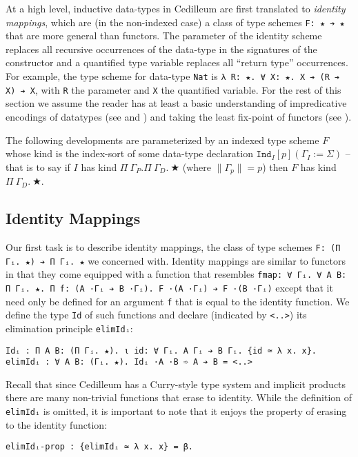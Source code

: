 \documentclass{article}
\newcommand{\indast}[4]{\texttt{Ind}_{#1} [#2] (#3 := #4)}
\newcommand{\lenc}[1]{\|#1\|}
\begin{document}
At a high level, inductive data-types in Cedilleum are first translated to
\textit{identity mappings}, which are (in the non-indexed case) a class of type
schemes \verb;F: ★ ➔ ★; that are more general than functors. The parameter of
the identity scheme replaces all recursive occurrences of the data-type in the
signatures of the constructor and a quantified type variable replaces all
``return type'' occurrences. For example, the type scheme for data-type
\verb;Nat; is \verb;λ R: ★. ∀ X: ★. X ➔ (R ➔ X) ➔ X;, with \verb;R; the
parameter and \verb;X; the quantified variable. For the rest of this
section we assume the reader has at least a basic understanding of impredicative
encodings of datatypes (see \cite{PP89_Inductive-Types-CC} and
\cite{Wa90_Rec-Types-For-Free}) and taking the least fix-point of functors (see
\cite{MFP91_Bananas-Lenses-Envelopes-Barbed-Wire}).

The following developments are parameterized by an indexed type scheme $F$ whose
kind is the index-sort of some data-type declaration
$\indast{I}{p}{\Gamma_I}{\Sigma}$ -- that is to say if $I$ has kind $Π\ \Gamma_P.
Π\ \Gamma_D.\ ★$ (where $\lenc{\Gamma_p} = p$) then $F$ has kind $Π\ \Gamma_D.\ ★$.

\subsection{Identity Mappings}
Our first task is to describe identity mappings, the class of type schemes
\verb;F: (Π Γᵢ. ★) ➔ Π Γᵢ. ★; we concerned with. Identity mappings are similar to functors
in that they come equipped with a function that resembles
\verb;fmap: ∀ Γᵢ. ∀ A B: Π Γᵢ. ★. Π f: (A ·Γᵢ ➔ B ·Γᵢ). F ·(A ·Γᵢ) ➔ F ·(B ·Γᵢ);
except that it need only be defined for an argument \verb;f; that is equal to the
identity function. We define the type \verb;Id; of such functions and declare
(indicated by \verb;<..>;) its elimination principle \verb;elimIdᵢ;:

\begin{verbatim}
Idᵢ : Π A B: (Π Γᵢ. ★). ι id: ∀ Γᵢ. A Γᵢ ➔ B Γᵢ. {id ≃ λ x. x}.
elimIdᵢ : ∀ A B: (Γᵢ. ★). Idᵢ ·A ·B ➾ A ➔ B = <..>
\end{verbatim}

Recall that since Cedilleum has a Curry-style type system and implicit
products there are many non-trivial functions that erase to identity.
While the definition of \verb;elimIdᵢ; is omitted, it is important to note that
it enjoys the property of erasing to the identity function:
\begin{verbatim}
elimIdᵢ-prop : {elimIdᵢ ≃ λ x. x} = β.
\end{verbatim}
\end{document}
